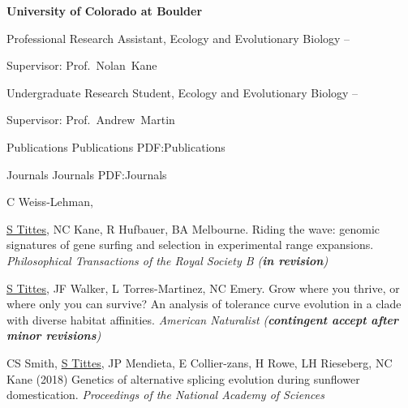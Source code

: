 \documentclass[letterpaper,MMMyyyy,nonstopmode]{simpleresumecv}
\begin{document}
\begin{Body}
\Entry
{\textbf{University of Colorado at Boulder}}

\Gap
\BulletItem
Professional Research Assistant, Ecology and Evolutionary Biology
\hfill
{} --
\begin{Detail}
Supervisor:
Prof.~Nolan~Kane
\end{Detail}

\Entry

\Gap
\BulletItem
Undergraduate Research Student, Ecology and Evolutionary Biology
\hfill
{} --
\begin{Detail}
Supervisor:
Prof.~Andrew~Martin
\end{Detail}


\Section
{Publications}
{Publications}
{PDF:Publications}

\SubSection
{Journals}
{Journals}
{PDF:Journals}

\begingroup
\renewcommand{\MaxNumberedItem}{[300]}


\Gap
\NumberedItem{[9]}
C Weiss-Lehman, {\underline{S Tittes}, NC Kane, R Hufbauer, BA Melbourne.
Riding the wave: genomic signatures of gene surfing and selection in experimental range expansions.
\textit{Philosophical Transactions of the Royal Society B (\textbf{in revision})}

\Gap
\NumberedItem{[8]}
{\underline{S Tittes}, JF Walker, L Torres-Martinez, NC Emery.
Grow where you thrive, or where only you can survive? An analysis of tolerance curve evolution in a clade with diverse habitat affinities.
\textit{American Naturalist (\textbf{contingent accept after minor revisions})}}


\Gap
\NumberedItem{[7]}
CS Smith, {\underline{S Tittes}, JP Mendieta, E Collier-zans, H Rowe, LH  Rieseberg, NC Kane 
(2018)
Genetics of alternative splicing evolution during sunflower domestication.
\textit{Proceedings of the National Academy of Sciences}}


}
\end{Body}
\end{document}
